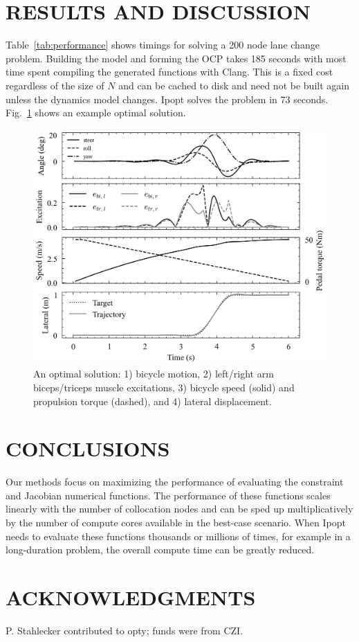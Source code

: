 \documentclass[11pt,twocolumn]{article}
\begin{document}
\section*{RESULTS AND DISCUSSION}
\vspace{-1em}
\pagestyle{empty}
%
Table~\ref{tab:performance} shows timings for solving a 200 node lane change
problem. Building the model and forming the OCP takes 185 seconds with most time
spent compiling the generated functions with Clang. This is a fixed cost
regardless of the size of \(N\) and can be cached to disk and need not be built
again unless the dynamics model changes. Ipopt solves the problem in 73 seconds.
Fig.~\ref{fig:trajectories} shows an example optimal solution.
%
\begin{figure}
    \centering
    \includegraphics[width=\linewidth]{figures/arm-muscle-bicycle-excitation.png}
    \caption{\small An optimal solution: 1) bicycle motion, 2) left/right
    arm biceps/triceps muscle excitations, 3) bicycle speed (solid) and
    propulsion torque (dashed), and 4) lateral displacement.}
    \label{fig:trajectories}
\end{figure}

\vspace{-1.5em}
\section*{CONCLUSIONS}
\vspace{-1em}
%
Our methods focus on maximizing the performance of evaluating the constraint and
Jacobian numerical functions. The performance of these functions scales linearly
with the number of collocation nodes and can be sped up multiplicatively by the
number of compute cores available in the best-case scenario. When Ipopt needs to
evaluate these functions thousands or millions of times, for example in a
long-duration problem, the overall compute time can be greatly reduced.

\vspace{-1em}



\vspace{-1em}
\section*{ACKNOWLEDGMENTS}
\vspace{-1em}
%
P. Stahlecker contributed to opty; funds were from CZI.
\end{document}
